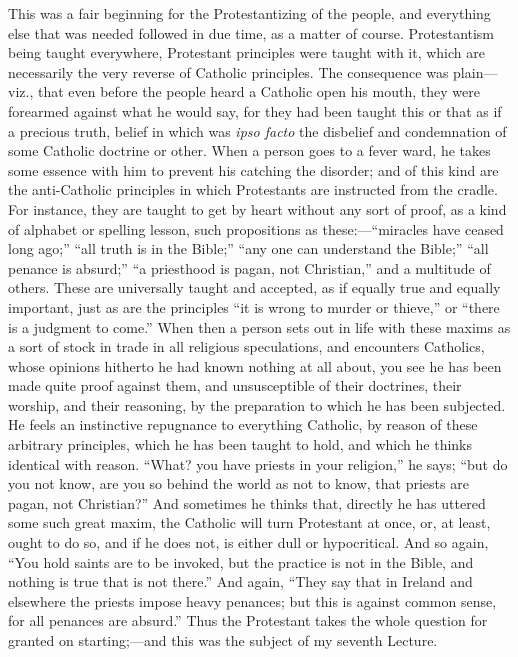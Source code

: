 This was a fair beginning for the Protestantizing of
the people, and everything else that was needed followed
in due time, as a matter of course. Protestantism being
taught everywhere, Protestant principles were taught with
it, which are necessarily the very reverse of Catholic
principles. The consequence was plain—viz., that
even before the people heard a Catholic open his mouth,
they were forearmed against what he would say, for they
had been taught this or that as if a precious truth,
belief in which was \emph{ipso facto} the disbelief and
condemnation of some Catholic doctrine or other. When a
person goes to a fever ward, he takes some essence with
him to prevent his catching the disorder; and of this
kind are the anti-Catholic principles in which
Protestants are instructed from the cradle. For instance,
they are taught to get by heart without any sort of
proof, as a kind of alphabet or spelling lesson, such
propositions as these:—``miracles have ceased
long ago;'' ``all truth is in the Bible;''
``any one can understand the Bible;'' ``all
penance is absurd;'' ``a priesthood is pagan, not
Christian,'' and a multitude of others. These are
universally taught and accepted, as if equally true and
equally important, just as are the principles ``it is
wrong to murder or thieve,'' or ``there is a
judgment to come.'' When then a person sets out in
life with these maxims as a sort of stock in trade in all
religious speculations, and encounters Catholics, whose
opinions hitherto he had known nothing at all about, you
see he has been made quite proof against them, and
unsusceptible of their doctrines, their worship, and
their reasoning, by the preparation to which he has been
subjected. He feels an instinctive repugnance to
everything Catholic, by reason of these arbitrary
principles, which he has been taught to hold, and which
he thinks identical with reason. ``What? you have
priests in your religion,'' he says; ``but do you
not know, are you so behind the world as not to know,
that priests are pagan, not Christian?'' And
sometimes he thinks that, directly he has uttered some
such great maxim, the Catholic will turn Protestant at
once, or, at least, ought to do so, and if he does not,
is either dull or hypocritical. And so again, ``You
hold saints are to be invoked, but the practice is not in
the Bible, and nothing is true that is not there.''
And again, ``They say that in Ireland and elsewhere
the priests impose heavy penances; but this is against
common sense, for all penances are absurd.'' Thus the
Protestant takes the whole question for granted on
starting;—and this was the subject of my seventh
Lecture.

